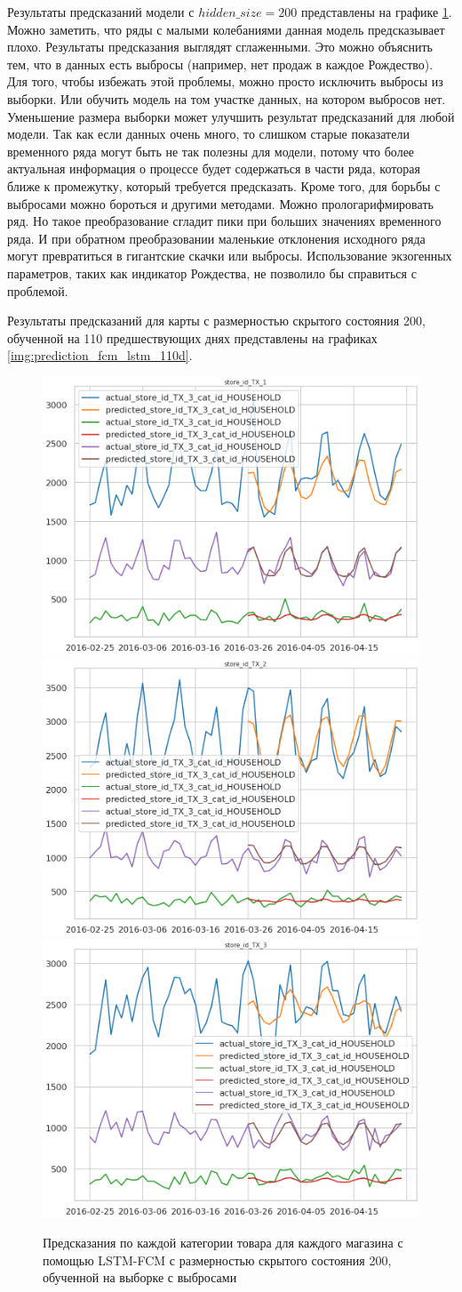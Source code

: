 Результаты предсказаний модели с $ hidden\_size = 200 $ представлены на графике \ref{img:prediction_fcm_lstm}.
Можно заметить, что ряды с малыми колебаниями данная модель предсказывает плохо.
Результаты предсказания выглядят сглаженными. Это можно объяснить тем, что
в данных есть выбросы (например, нет продаж в каждое Рождество).
Для того, чтобы избежать этой проблемы, можно просто исключить  выбросы из выборки.
Или обучить модель на том участке данных, на котором выбросов нет.
Уменьшение размера выборки может улучшить результат предсказаний для любой модели.
Так как если данных очень много, то слишком старые показатели временного ряда
могут быть не так полезны для модели, потому что более актуальная информация
о процессе будет содержаться в части ряда, которая ближе к промежутку, который
требуется предсказать.
Кроме того, для борьбы с выбросами можно бороться и другими методами.
Можно прологарифмировать ряд. Но такое преобразование сгладит пики при больших значениях
временного ряда. И при обратном преобразовании маленькие отклонения исходного ряда
могут превратиться в гигантские скачки или выбросы.
Использование экзогенных параметров, таких как индикатор Рождества, не позволило бы
справиться с проблемой.

Результаты предсказаний для карты с размерностью скрытого состояния 200, обученной на 110 предшествующих днях
представлены на графиках \ref{img:prediction_fcm_lstm_110d}.

\def\figurename{Рис}
\begin{figure}[t]
	\centering
	\includegraphics[width=0.25\columnwidth]{./img/fcm_lstm_tx1.png}
	\includegraphics[width=0.25\columnwidth]{./img/fcm_lstm_tx2.png}
	\includegraphics[width=0.25\columnwidth]{./img/fcm_lstm_tx3.png}
	\caption{Предсказания по каждой категории товара для каждого магазина с помощью LSTM-FCM с размерностью скрытого состояния 200, обученной на выборке с выбросами}
	\label{img:prediction_fcm_lstm}
\end{figure}


